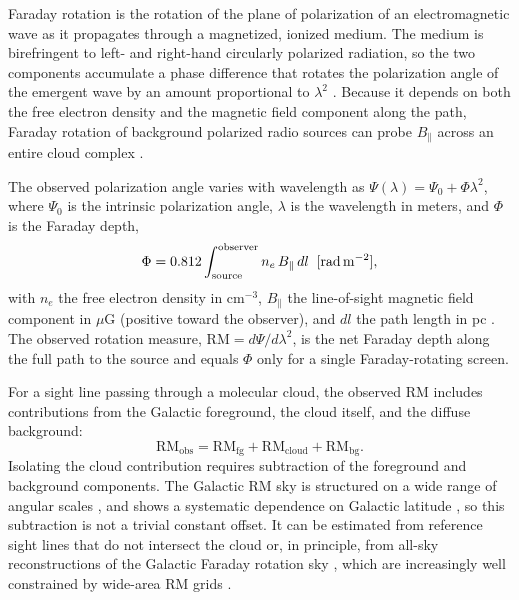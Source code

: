 \documentclass[twocolumn]{aastex701}
\begin{document}
Faraday rotation is the rotation of the plane of polarization of an
electromagnetic wave as it propagates through a magnetized, ionized medium.
The medium is birefringent to left- and right-hand circularly polarized
radiation, so the two components accumulate a phase difference that rotates
the polarization angle of the emergent wave by an amount proportional to
$\lambda^2$ \citep{burn1966,brentjens2005}. Because it depends on both the
free electron density and the magnetic field component along the path,
Faraday rotation of background polarized radio sources can probe
$B_\parallel$ across an entire cloud complex
\citep{wolleben2004,tahani2018,takahashi2021introduction}.

The observed polarization angle varies with wavelength as
$\Psi(\lambda) = \Psi_0 + \Phi\lambda^2$, where $\Psi_0$ is the intrinsic
polarization angle, $\lambda$ is the wavelength in meters, and $\Phi$ is the
Faraday depth,
\begin{equation}
\label{eq:rm-basic}
    \Phi = 0.812 \int_{\rm source}^{\rm observer} n_e\,B_\parallel \, dl
    \;\;[\mathrm{rad\,m^{-2}}],
\end{equation}
with $n_e$ the free electron density in cm$^{-3}$, $B_\parallel$ the
line-of-sight magnetic field component in $\mu$G (positive toward the
observer), and $dl$ the path length in pc \citep{han2017observing}. The
observed rotation measure, $\mathrm{RM} = d\Psi/d\lambda^2$, is the net
Faraday depth along the full path to the source and equals $\Phi$ only for a
single Faraday-rotating screen.

For a sight line passing through a molecular cloud, the observed RM includes
contributions from the Galactic foreground, the cloud itself, and the diffuse
background:
\begin{equation}
\label{eq:rm-split}
    \mathrm{RM_{obs}} = \mathrm{RM_{fg}} + \mathrm{RM_{cloud}} + \mathrm{RM_{bg}}.
\end{equation}
Isolating the cloud contribution requires subtraction of the foreground and
background components. The Galactic RM sky is structured on a wide range of
angular scales \citep{simonetti1984small,haverkorn2008outer,stil2010structure},
and shows a systematic dependence on Galactic latitude
\citep{schnitzeler2010latitude,van2011modeling}, so this subtraction is not a
trivial constant offset. It can be estimated from reference sight lines that
do not intersect the cloud \citep{tahani2018,tahani2025mcblos} or, in
principle, from all-sky reconstructions of the Galactic Faraday rotation sky
\citep{hutschenreuter2022galactic}, which are increasingly well constrained
by wide-area RM grids \citep{o2023faraday}.
\end{document}
